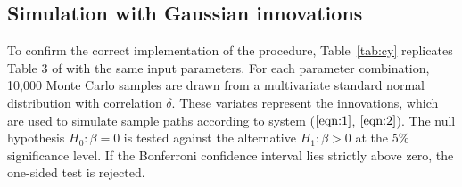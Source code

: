 \documentclass{article}
\begin{document}
\subsection{Simulation with Gaussian innovations}
\label{Simulation with Gaussian innovations}
To confirm the correct implementation of the procedure, Table~\vref{tab:cy} replicates Table 3 of \citet{campbell2006efficient} with the same input parameters. For each parameter combination, 10,000 Monte Carlo samples are drawn from a multivariate standard normal distribution with correlation $\delta$. These variates represent the innovations, which are used to simulate sample paths according to system ($\ref{eqn:1}$, $\ref{eqn:2}$). The null hypothesis $H_0: \beta = 0$ is tested against the alternative $H_1: \beta > 0$ at the 5\% significance level. If the Bonferroni confidence interval lies strictly above zero, the one-sided test is rejected. 
\end{document}
